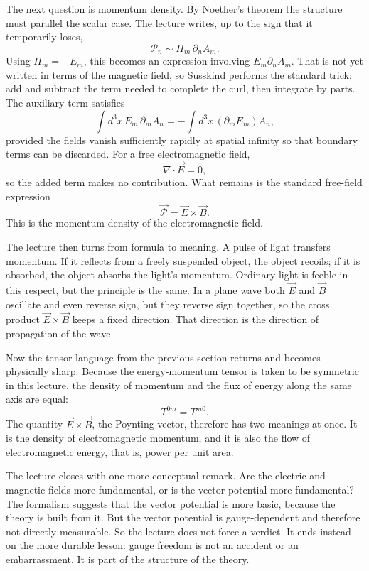 The next question is momentum density. By Noether's theorem the structure must parallel the scalar case. The lecture writes, up to the sign that it temporarily loses,
\begin{equation}
\mathcal P_n\sim \Pi_m\,\partial_n A_m.
\end{equation}
Using \(\Pi_m=-E_m\), this becomes an expression involving \(E_m\partial_nA_m\). That is not yet written in terms of the magnetic field, so Susskind performs the standard trick: add and subtract the term needed to complete the curl, then integrate by parts. The auxiliary term satisfies
\begin{equation}
\int d^3x\,E_m\,\partial_mA_n
=
-\int d^3x\,(\partial_mE_m)A_n,
\end{equation}
provided the fields vanish sufficiently rapidly at spatial infinity so that boundary terms can be discarded. For a free electromagnetic field,
\begin{equation}
\nabla\cdot\vec E=0,
\end{equation}
so the added term makes no contribution. What remains is the standard free-field expression
\begin{equation}
\vec{\mathcal P}=\vec E\times\vec B.
\end{equation}
This is the momentum density of the electromagnetic field.

The lecture then turns from formula to meaning. A pulse of light transfers momentum. If it reflects from a freely suspended object, the object recoils; if it is absorbed, the object absorbs the light's momentum. Ordinary light is feeble in this respect, but the principle is the same. In a plane wave both \(\vec E\) and \(\vec B\) oscillate and even reverse sign, but they reverse sign together, so the cross product \(\vec E\times\vec B\) keeps a fixed direction. That direction is the direction of propagation of the wave.

Now the tensor language from the previous section returns and becomes physically sharp. Because the energy-momentum tensor is taken to be symmetric in this lecture, the density of momentum and the flux of energy along the same axis are equal:
\begin{equation}
T^{0m}=T^{m0}.
\end{equation}
The quantity \(\vec E\times\vec B\), the Poynting vector, therefore has two meanings at once. It is the density of electromagnetic momentum, and it is also the flow of electromagnetic energy, that is, power per unit area.

The lecture closes with one more conceptual remark. Are the electric and magnetic fields more fundamental, or is the vector potential more fundamental? The formalism suggests that the vector potential is more basic, because the theory is built from it. But the vector potential is gauge-dependent and therefore not directly measurable. So the lecture does not force a verdict. It ends instead on the more durable lesson: gauge freedom is not an accident or an embarrassment. It is part of the structure of the theory.


